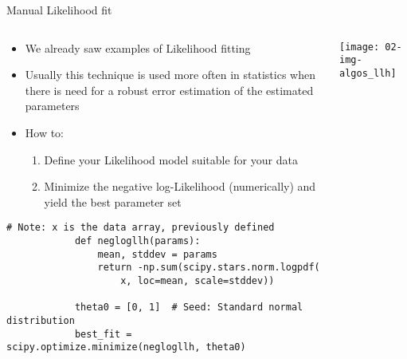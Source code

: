   \begin{frame}[fragile]{Manual Likelihood fit}
    \begin{columns}
      \begin{column}{0.65\textwidth}
        \begin{itemize}
          \item We already saw examples of Likelihood fitting
          \item Usually this technique is used more often in statistics when there is need for a robust error estimation of the estimated parameters
          \item How to:
          \begin{enumerate}
            \item Define your Likelihood model suitable for your data
            \item Minimize the negative log-Likelihood (numerically) and yield the best parameter set
          \end{enumerate}
        \end{itemize}
        \begin{mdframed}
          \begin{lstlisting}[style=dark, gobble=10, title=\lsttitlelight{Gaussian LLH fit [Note: example shortened]}]
            # Note: x is the data array, previously defined
            def neglogllh(params):
                mean, stddev = params
                return -np.sum(scipy.stars.norm.logpdf(
                    x, loc=mean, scale=stddev))

            theta0 = [0, 1]  # Seed: Standard normal distribution
            best_fit = scipy.optimize.minimize(neglogllh, theta0)
          \end{lstlisting}
        \end{mdframed}
      \end{column}
      \begin{column}{0.35\textwidth}
        \vspace{1em}

        \texttt{[image: 02-img-algos\_llh]}
      \end{column}
    \end{columns}
  \end{frame}

